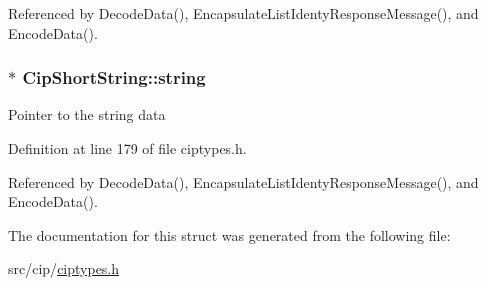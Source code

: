 \-Referenced by \-Decode\-Data(), \-Encapsulate\-List\-Identy\-Response\-Message(), and \-Encode\-Data().

\hypertarget{structCipShortString_a4a9780b559b58e74f6203f6d82cfd88d}{
\subsubsection[{string}]{$\ast$ {\bf \-Cip\-Short\-String\-::string}}}\label{d4/def/structCipShortString_a4a9780b559b58e74f6203f6d82cfd88d}
\-Pointer to the string data 

\-Definition at line 179 of file ciptypes.\-h.



\-Referenced by \-Decode\-Data(), \-Encapsulate\-List\-Identy\-Response\-Message(), and \-Encode\-Data().



\-The documentation for this struct was generated from the following file\-:\begin{DoxyCompactItemize}
\item 
src/cip/\hyperlink{ciptypes_8h}{ciptypes.\-h}\end{DoxyCompactItemize}
